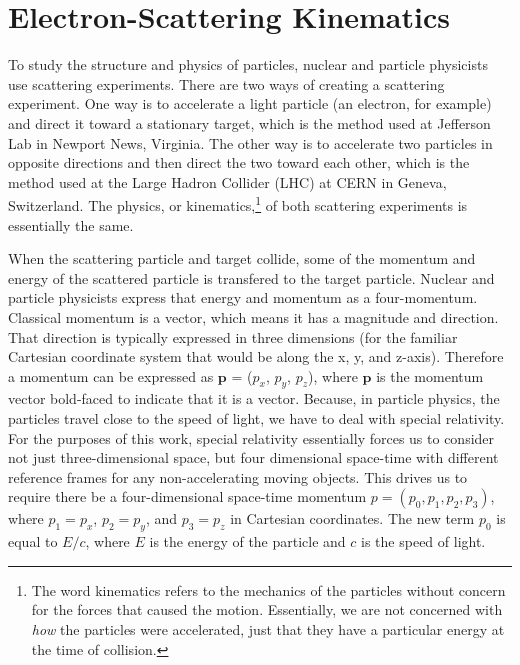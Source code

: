 \section{Electron-Scattering Kinematics}
To study the structure and physics of particles, nuclear and particle physicists use scattering experiments. There are two ways of creating a scattering experiment. One way is to accelerate a light particle (an electron, for example) and direct it toward a stationary target, which is the method used at Jefferson Lab in Newport News, Virginia. The other way is to accelerate two particles in opposite directions and then direct the two toward each other, which is the method used at the Large Hadron Collider (LHC) at CERN in Geneva, Switzerland. The physics, or kinematics,\footnote{The word kinematics refers to the mechanics of the particles without concern for the forces that caused the motion. Essentially, we are not concerned with \textit{how} the particles were accelerated, just that they have a particular energy at the time of collision.} of both scattering experiments is essentially the same. 

When the scattering particle and target collide, some of the momentum and energy of the scattered particle is transfered to the target particle. Nuclear and particle physicists express that energy and momentum as a four-momentum. Classical momentum is a vector, which means it has a magnitude and direction. That direction is typically expressed in three dimensions (for the familiar Cartesian coordinate system that would be along the x, y, and z-axis). Therefore a momentum can be expressed as $\mathbf{p}$ = ($p_x$, $p_y$, $p_z$), where $\mathbf{p}$ is the momentum vector bold-faced to indicate that it is a vector. Because, in particle physics, the particles travel close to the speed of light, we have to deal with special relativity. For the purposes of this work, special relativity essentially forces us to consider not just three-dimensional space, but four dimensional space-time with different reference frames for any non-accelerating moving objects. This drives us to require there be a four-dimensional space-time momentum $p=(p_0,p_1,p_2,p_3)$, where $p_1=p_x$, $p_2=p_y$, and $p_3=p_z$ in Cartesian coordinates. The new term $p_0$ is equal to $E/c$, where $E$ is the energy of the particle and $c$ is the speed of light.

